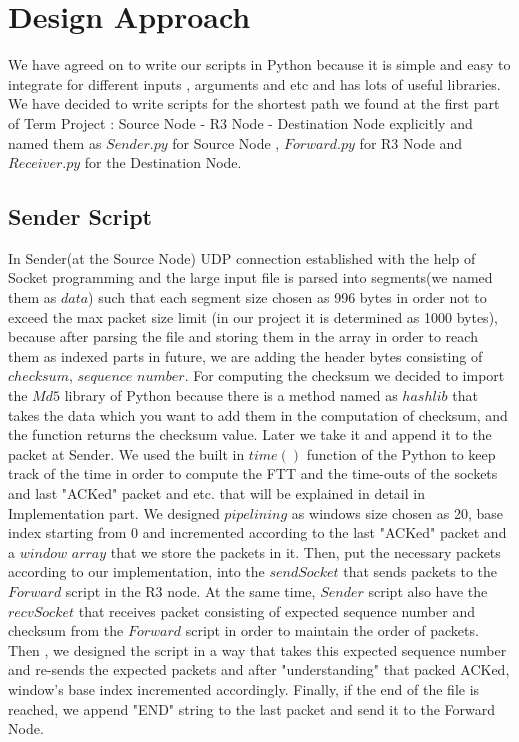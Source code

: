 \documentclass[conference]{IEEEtran}
\begin{document}
\section{Design Approach}



We have agreed on to write our scripts in Python because it is simple and easy to integrate for different inputs , arguments and etc and has lots of useful libraries. We have decided to write scripts for the shortest path we found at the first part of Term Project : Source Node - R3 Node - Destination Node explicitly and named them as $Sender.py$ for Source Node , $Forward.py$  for R3 Node and  $Receiver.py$ for the Destination Node. 
\subsection{Sender Script}\label{AA}

In Sender(at the Source Node) UDP connection established with the help of Socket programming and the large input file is parsed into segments(we named them as $data$) such that each segment size chosen as 996 bytes in order not to exceed the max packet size limit (in our project it is determined as 1000 bytes), because after parsing the file and storing them in the array in order to reach them as indexed parts in future, we are adding the header bytes consisting of $checksum$,  $sequence$ $number$. For computing the checksum we decided to import the $Md5$ library of Python because there is a method named as $hashlib$ that takes the data which you want to add them in the computation of checksum, and the function returns the checksum value. Later we take it and append it to the packet at Sender. We used the built in $time()$ function of the Python to keep track of the time in order to compute the FTT and the time-outs of the sockets and last "ACKed" packet and etc. that will be explained in detail in Implementation part. We designed $pipelining$ as windows size chosen as 20, base index starting from 0 and incremented according to the last "ACKed" packet and a $window$ $array$ that we store the packets in it. Then, put the necessary packets according to our implementation, into the $sendSocket$ that sends packets to the $Forward$ script in the R3 node. At the same time, $Sender$ script also have the $recvSocket$ that receives packet consisting of expected sequence number and checksum from the $Forward$ script in order to maintain the order of packets. Then , we designed the script in a way that takes this expected sequence number and re-sends the expected packets and after "understanding" that packed ACKed, window's base index incremented accordingly. Finally, if the end of the file is reached, we append "END" string to the last packet and send it to the Forward Node.  
\end{document}
